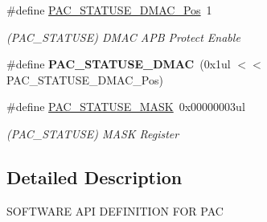 \begin{DoxyCompactItemize}
\item 
\hypertarget{group___s_a_m_l21___p_a_c_ga7ae8c6bdd727fe8e7acdbbba6c27fbfd}{}\#define \hyperlink{group___s_a_m_l21___p_a_c_ga7ae8c6bdd727fe8e7acdbbba6c27fbfd}{P\+A\+C\+\_\+\+S\+T\+A\+T\+U\+S\+E\+\_\+\+D\+M\+A\+C\+\_\+\+Pos}~1\label{group___s_a_m_l21___p_a_c_ga7ae8c6bdd727fe8e7acdbbba6c27fbfd}

\begin{DoxyCompactList}\small\item\em (P\+A\+C\+\_\+\+S\+T\+A\+T\+U\+S\+E) D\+M\+A\+C A\+P\+B Protect Enable \end{DoxyCompactList}\item 
\hypertarget{group___s_a_m_l21___p_a_c_ga78cd6a4dab5ce9633ac609e9e21117e2}{}\#define {\bfseries P\+A\+C\+\_\+\+S\+T\+A\+T\+U\+S\+E\+\_\+\+D\+M\+A\+C}~(0x1ul $<$$<$ P\+A\+C\+\_\+\+S\+T\+A\+T\+U\+S\+E\+\_\+\+D\+M\+A\+C\+\_\+\+Pos)\label{group___s_a_m_l21___p_a_c_ga78cd6a4dab5ce9633ac609e9e21117e2}

\item 
\hypertarget{group___s_a_m_l21___p_a_c_ga7d42cd606b69765940b70374dc6589cd}{}\#define \hyperlink{group___s_a_m_l21___p_a_c_ga7d42cd606b69765940b70374dc6589cd}{P\+A\+C\+\_\+\+S\+T\+A\+T\+U\+S\+E\+\_\+\+M\+A\+S\+K}~0x00000003ul\label{group___s_a_m_l21___p_a_c_ga7d42cd606b69765940b70374dc6589cd}

\begin{DoxyCompactList}\small\item\em (P\+A\+C\+\_\+\+S\+T\+A\+T\+U\+S\+E) M\+A\+S\+K Register \end{DoxyCompactList}\end{DoxyCompactItemize}


\subsection{Detailed Description}
S\+O\+F\+T\+W\+A\+R\+E A\+P\+I D\+E\+F\+I\+N\+I\+T\+I\+O\+N F\+O\+R P\+A\+C 